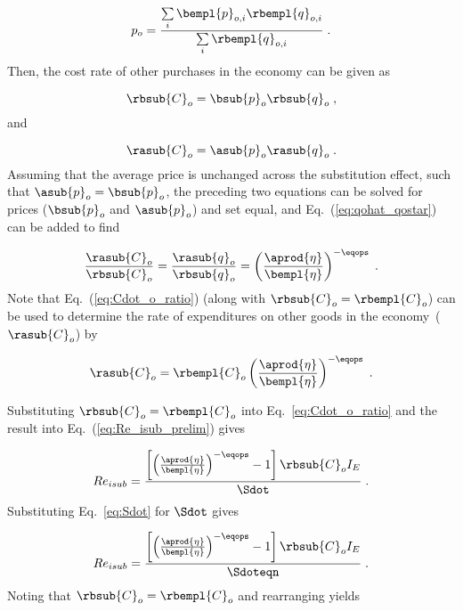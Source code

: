 \begin{equation}
  p_o = \frac{\sum\limits_i \bempl{p}_{o,i} \rbempl{q}_{o,i}}{\sum\limits_i \rbempl{q}_{o,i}} \; .
\end{equation}
%
Then, the cost rate of other purchases in the economy can be given as

\begin{equation}
  \rbsub{C}_o = \bsub{p}_o \rbsub{q}_o \; ,
\end{equation}
%
and

\begin{equation}
  \rasub{C}_o = \asub{p}_o \rasub{q}_o \; .
\end{equation}
%
Assuming that the average price is unchanged across the substitution effect,
such that $\asub{p}_o = \bsub{p}_o$,
the preceding two equations can be solved for prices ($\bsub{p}_o$ and $\asub{p}_o$)
and set equal, and
Eq.~(\ref{eq:qohat_qostar}) can be added to find

\begin{equation} \label{eq:Cdot_o_ratio}
  \frac{\rasub{C}_o}{\rbsub{C}_o} 
      = \frac{\rasub{q}_o}{\rbsub{q}_o} 
      = \left( \frac{\aprod{\eta}}{\bempl{\eta}} \right)^{-\eqops}  \; .
\end{equation}
%
Note that Eq.~(\ref{eq:Cdot_o_ratio}) 
(along with $\rbsub{C}_o = \rbempl{C}_o$)
can be used to determine the rate of expenditures 
on other goods in the economy~($\rasub{C}_o$) by

\begin{equation}
  \rasub{C}_o = \rbempl{C}_o \left( \frac{\aprod{\eta}}{\bempl{\eta}} \right)^{-\eqops} \; .
\end{equation}

Substituting $\rbsub{C}_o = \rbempl{C}_o$ into Eq.~\ref{eq:Cdot_o_ratio} and 
the result into Eq.~(\ref{eq:Re_isub_prelim}) gives

\begin{equation}
  Re_{isub} = \frac{\left[ \left( \frac{\aprod{\eta}}{\bempl{\eta}} \right)^{-\eqops} - 1  \right] \rbsub{C}_o I_E} {\Sdot} \; .
\end{equation}
%
Substituting Eq.~\ref{eq:Sdot} for $\Sdot$ gives

\begin{equation}
  Re_{isub} = \frac{\left[ \left(\frac{\aprod{\eta}}{\bempl{\eta}} \right)
                  ^{-\eqops} - 1  \right] \rbsub{C}_o I_E}
                  {\Sdoteqn} \; .
\end{equation}
%
Noting that $\rbsub{C}_o = \rbempl{C}_o$ and rearranging yields

